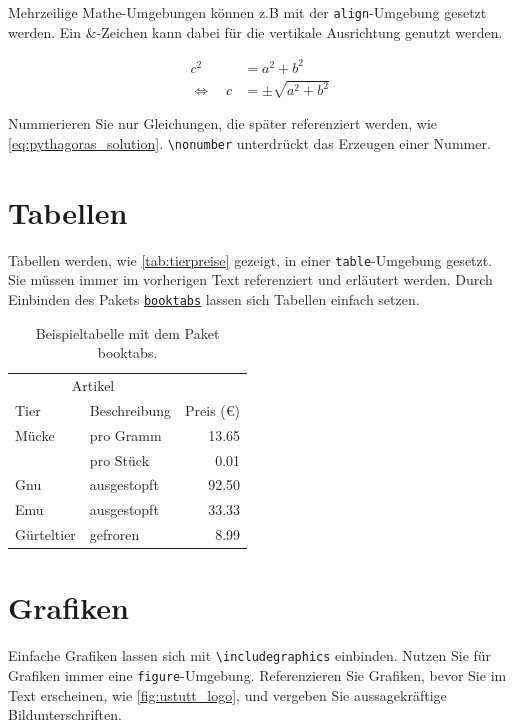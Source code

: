 Mehrzeilige Mathe-Umgebungen können z.B mit der \texttt{align}-Umgebung gesetzt werden. Ein \&-Zeichen kann dabei für die vertikale Ausrichtung genutzt werden.

\begin{align}
c^2 &= a^2 + b^2 \nonumber \\
\Leftrightarrow \quad c &= \pm \sqrt{a^2 + b^2} \label{eq:pythagoras_solution}
\end{align}


Nummerieren Sie nur Gleichungen, die später referenziert werden, wie \autoref{eq:pythagoras_solution}. 
\texttt{\textbackslash nonumber} unterdrückt das Erzeugen einer Nummer.

\section{Tabellen}


Tabellen werden, wie \autoref{tab:tierpreise} gezeigt, in einer \texttt{table}-Umgebung gesetzt.
Sie müssen immer im vorherigen Text referenziert und erläutert werden. 
Durch Einbinden des Pakets \href{https://ctan.kako-dev.de/macros/latex/contrib/booktabs/booktabs.pdf}{\texttt{booktabs}} lassen sich Tabellen einfach setzen. 

    \begin{table}[htb]
    \centering
    \begin{tabular}{@{}llr@{}} \toprule
    \multicolumn{2}{c}{Artikel} \\ 
    \cmidrule(r){1-2}Tier  & Beschreibung & Preis (€)\\ \midrule
        Mücke & pro Gramm    & 13.65 \\
        & pro Stück    & 0.01 \\
        Gnu   & ausgestopft  & 92.50 \\
        Emu   & ausgestopft  & 33.33 \\
        Gürteltier & gefroren & 8.99 \\ \bottomrule
    \end{tabular}
    \caption{Beispieltabelle mit dem Paket booktabs.} 
    \label{tab:tierpreise}
    \end{table}

\section{Grafiken}

Einfache Grafiken lassen sich mit \texttt{\textbackslash includegraphics} einbinden. Nutzen Sie für Grafiken immer eine \texttt{figure}-Umgebung. Referenzieren Sie Grafiken, bevor Sie im Text erscheinen, wie \autoref{fig:ustutt_logo}, und vergeben Sie aussagekräftige Bildunterschriften.

